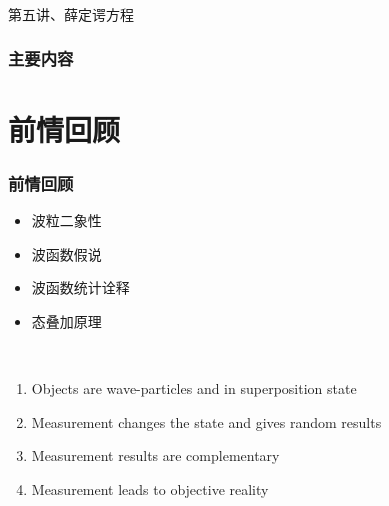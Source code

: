 \begin{frame} [plain]
    \frametitle{}
    \Background[1] 
    \begin{center}
    { {\huge 第五讲、薛定谔方程 }}
    \end{center}  
    \addtocounter{framenumber}{-1}   
\end{frame}

\begin{frame}
        \frametitle{主要内容}
        \transfade
        \tableofcontents
        \addtocounter{framenumber}{-1} 
\end{frame}

\section{前情回顾}

\begin{frame}
    \frametitle{前情回顾}
    \begin{itemize}
        \item 波粒二象性
        \item 波函数假说
        \item 波函数统计诠释
        \item 态叠加原理
    \end{itemize}
\end{frame}  

\begin{frame}
    \begin{tcolorbox4}[Conclusion]
        ~~\\
    \begin{enumerate}
        \item Objects are wave-particles and in superposition state
        \item Measurement changes the state and gives random results
        \item Measurement results are complementary
        \item Measurement leads to objective reality
    \end{enumerate}
    \end{tcolorbox4}
\end{frame}  

\begin{frame}
    \centering
\end{frame}

